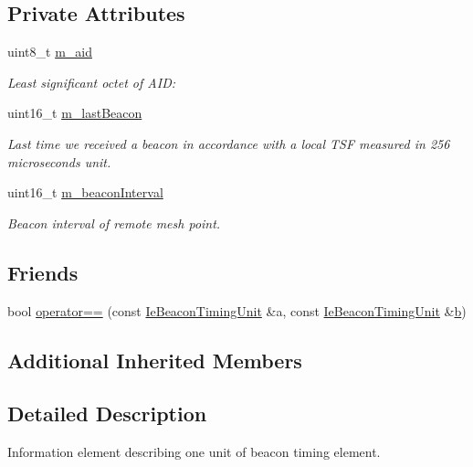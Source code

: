 \subsection*{Private Attributes}
\begin{DoxyCompactItemize}
\item 
uint8\+\_\+t \hyperlink{classns3_1_1dot11s_1_1IeBeaconTimingUnit_afe3d69ac26ca26740b2a096d1baa1df0}{m\+\_\+aid}
\begin{DoxyCompactList}\small\item\em Least significant octet of A\+ID\+: \end{DoxyCompactList}\item 
uint16\+\_\+t \hyperlink{classns3_1_1dot11s_1_1IeBeaconTimingUnit_a08fec700831f77cb940261e12440d977}{m\+\_\+last\+Beacon}
\begin{DoxyCompactList}\small\item\em Last time we received a beacon in accordance with a local T\+SF measured in 256 microseconds unit. \end{DoxyCompactList}\item 
uint16\+\_\+t \hyperlink{classns3_1_1dot11s_1_1IeBeaconTimingUnit_a74fa45415f418caaed1fca6ff8150852}{m\+\_\+beacon\+Interval}
\begin{DoxyCompactList}\small\item\em Beacon interval of remote mesh point. \end{DoxyCompactList}\end{DoxyCompactItemize}
\subsection*{Friends}
\begin{DoxyCompactItemize}
\item 
bool \hyperlink{classns3_1_1dot11s_1_1IeBeaconTimingUnit_a72734415a9b1addc4c21ba90d8a41636}{operator==} (const \hyperlink{classns3_1_1dot11s_1_1IeBeaconTimingUnit}{Ie\+Beacon\+Timing\+Unit} \&a, const \hyperlink{classns3_1_1dot11s_1_1IeBeaconTimingUnit}{Ie\+Beacon\+Timing\+Unit} \&\hyperlink{lte__pathloss_8m_a21ad0bd836b90d08f4cf640b4c298e7c}{b})
\end{DoxyCompactItemize}
\subsection*{Additional Inherited Members}


\subsection{Detailed Description}
Information element describing one unit of beacon timing element. 

